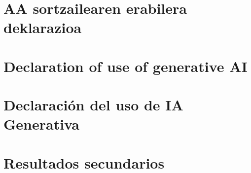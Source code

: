 \documentclass[a4paper, 11pt, oneside]{memoir}
\begin{document}
 
\addappheadtotoc
\appendix
 
\ifdefined\euskaraz
\chapter{AA sortzailearen erabilera deklarazioa} \label{ch:deklarazioa}

\else\ifdefined\english
\chapter{Declaration of use of generative AI} \label{ch:declaration}

\else
\chapter{Declaración del uso de IA Generativa} \label{ch:declaracion}

\fi\fi

\chapter{Resultados secundarios} \label{ch:anexo-resultados}

 
 



 
\end{document}
